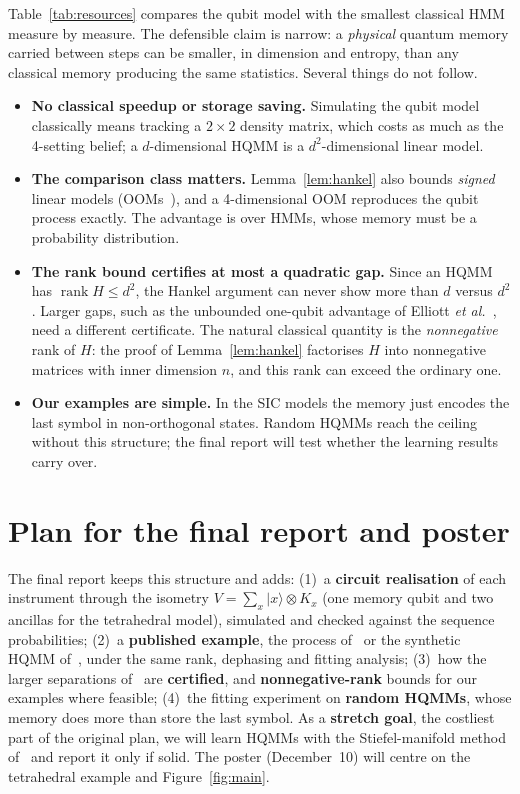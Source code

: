 \documentclass[11pt]{article}
\newcommand{\ket}[1]{\lvert #1\rangle}
\newcommand{\rank}{\operatorname{rank}}
\begin{document}
Table~\ref{tab:resources} compares the qubit model with the smallest classical HMM measure by measure. The defensible claim is narrow: a \emph{physical} quantum memory carried between steps can be smaller, in dimension and entropy, than any classical memory producing the same statistics. Several things do not follow.
\begin{itemize}
\item \textbf{No classical speedup or storage saving.} Simulating the qubit model classically means tracking a $2\times2$ density matrix, which costs as much as the 4-setting belief; a $d$-dimensional HQMM is a $d^2$-dimensional linear model.
\item \textbf{The comparison class matters.} Lemma~\ref{lem:hankel} also bounds \emph{signed} linear models (OOMs~\cite{jaeger2000}), and a 4-dimensional OOM reproduces the qubit process exactly. The advantage is over HMMs, whose memory must be a probability distribution.
\item \textbf{The rank bound certifies at most a quadratic gap.} Since an HQMM has $\rank H\le d^2$, the Hankel argument can never show more than $d$ versus $d^2$. Larger gaps, such as the unbounded one-qubit advantage of Elliott \emph{et al.}~\cite{elliott2020}, need a different certificate. The natural classical quantity is the \emph{nonnegative} rank of $H$: the proof of Lemma~\ref{lem:hankel} factorises $H$ into nonnegative matrices with inner dimension $n$, and this rank can exceed the ordinary one.
\item \textbf{Our examples are simple.} In the SIC models the memory just encodes the last symbol in non-orthogonal states. Random HQMMs reach the ceiling without this structure; the final report will test whether the learning results carry over.
\end{itemize}

\section{Plan for the final report and poster}\label{sec:plan}

The final report keeps this structure and adds: (1)~a \textbf{circuit realisation} of each instrument through the isometry $V = \sum_x \ket{x}\otimes K_x$ (one memory qubit and two ancillas for the tetrahedral model), simulated and checked against the sequence probabilities; (2)~a \textbf{published example}, the process of~\cite{ghafari2019} or the synthetic HQMM of~\cite{srinivasan2018}, under the same rank, dephasing and fitting analysis; (3)~how the larger separations of~\cite{elliott2020} are \textbf{certified}, and \textbf{nonnegative-rank} bounds for our examples where feasible; (4)~the fitting experiment on \textbf{random HQMMs}, whose memory does more than store the last symbol. As a \textbf{stretch goal}, the costliest part of the original plan, we will learn HQMMs with the Stiefel-manifold method of~\cite{adhikary2020} and report it only if solid. The poster (December~10) will centre on the tetrahedral example and Figure~\ref{fig:main}.
\end{document}
